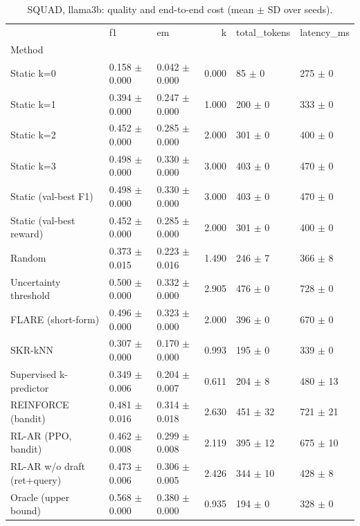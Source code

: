 \begin{table}
\caption{SQUAD, llama3b: quality and end-to-end cost (mean $\pm$ SD over seeds).}
\begin{tabular}{lllrll}
\toprule
 & f1 & em & k & total_tokens & latency_ms \\
Method &  &  &  &  &  \\
\midrule
Static k=0 & 0.158 $\pm$ 0.000 & 0.042 $\pm$ 0.000 & 0.000 & 85 $\pm$ 0 & 275 $\pm$ 0 \\
Static k=1 & 0.394 $\pm$ 0.000 & 0.247 $\pm$ 0.000 & 1.000 & 200 $\pm$ 0 & 333 $\pm$ 0 \\
Static k=2 & 0.452 $\pm$ 0.000 & 0.285 $\pm$ 0.000 & 2.000 & 301 $\pm$ 0 & 400 $\pm$ 0 \\
Static k=3 & 0.498 $\pm$ 0.000 & 0.330 $\pm$ 0.000 & 3.000 & 403 $\pm$ 0 & 470 $\pm$ 0 \\
Static (val-best F1) & 0.498 $\pm$ 0.000 & 0.330 $\pm$ 0.000 & 3.000 & 403 $\pm$ 0 & 470 $\pm$ 0 \\
Static (val-best reward) & 0.452 $\pm$ 0.000 & 0.285 $\pm$ 0.000 & 2.000 & 301 $\pm$ 0 & 400 $\pm$ 0 \\
Random & 0.373 $\pm$ 0.015 & 0.223 $\pm$ 0.016 & 1.490 & 246 $\pm$ 7 & 366 $\pm$ 8 \\
Uncertainty threshold & 0.500 $\pm$ 0.000 & 0.332 $\pm$ 0.000 & 2.905 & 476 $\pm$ 0 & 728 $\pm$ 0 \\
FLARE (short-form) & 0.496 $\pm$ 0.000 & 0.323 $\pm$ 0.000 & 2.000 & 396 $\pm$ 0 & 670 $\pm$ 0 \\
SKR-kNN & 0.307 $\pm$ 0.000 & 0.170 $\pm$ 0.000 & 0.993 & 195 $\pm$ 0 & 339 $\pm$ 0 \\
Supervised k-predictor & 0.349 $\pm$ 0.006 & 0.204 $\pm$ 0.007 & 0.611 & 204 $\pm$ 8 & 480 $\pm$ 13 \\
REINFORCE (bandit) & 0.481 $\pm$ 0.016 & 0.314 $\pm$ 0.018 & 2.630 & 451 $\pm$ 32 & 721 $\pm$ 21 \\
RL-AR (PPO, bandit) & 0.462 $\pm$ 0.008 & 0.299 $\pm$ 0.008 & 2.119 & 395 $\pm$ 12 & 675 $\pm$ 10 \\
RL-AR w/o draft (ret+query) & 0.473 $\pm$ 0.006 & 0.306 $\pm$ 0.005 & 2.426 & 344 $\pm$ 10 & 428 $\pm$ 8 \\
Oracle (upper bound) & 0.568 $\pm$ 0.000 & 0.380 $\pm$ 0.000 & 0.935 & 194 $\pm$ 0 & 328 $\pm$ 0 \\
\bottomrule
\end{tabular}
\end{table}
